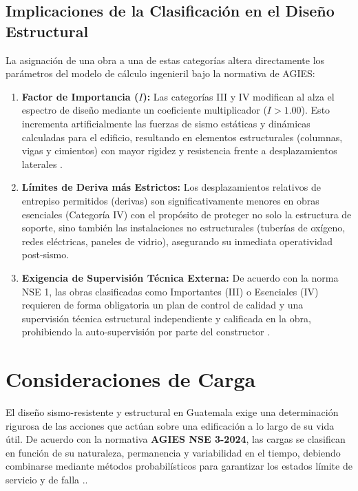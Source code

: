 \documentclass[14pt,letterpaper]{extarticle}
\begin{document}
	
	\subsection{Implicaciones de la Clasificación en el Diseño Estructural}
	La asignación de una obra a una de estas categorías altera directamente los parámetros del modelo de cálculo ingenieril bajo la normativa de AGIES:
	
	\begin{enumerate}
		\item \textbf{Factor de Importancia ($I$):} Las categorías III y IV modifican al alza el espectro de diseño mediante un coeficiente multiplicador ($I > 1.00$). Esto incrementa artificialmente las fuerzas de sismo estáticas y dinámicas calculadas para el edificio, resultando en elementos estructurales (columnas, vigas y cimientos) con mayor rigidez y resistencia frente a desplazamientos laterales .
		\item \textbf{Límites de Deriva más Estrictos:} Los desplazamientos relativos de entrepiso permitidos (derivas) son significativamente menores en obras esenciales (Categoría IV) con el propósito de proteger no solo la estructura de soporte, sino también las instalaciones no estructurales (tuberías de oxígeno, redes eléctricas, paneles de vidrio), asegurando su inmediata operatividad post-sismo.
		\item \textbf{Exigencia de Supervisión Técnica Externa:} De acuerdo con la norma NSE 1, las obras clasificadas como Importantes (III) o Esenciales (IV) requieren de forma obligatoria un plan de control de calidad y una supervisión técnica estructural independiente y calificada en la obra, prohibiendo la auto-supervisión por parte del constructor .
	\end{enumerate}
	
	
	

	\section{Consideraciones de Carga}
	
	El diseño sismo-resistente y estructural en Guatemala exige una determinación rigurosa de las acciones que actúan sobre una edificación a lo largo de su vida útil. De acuerdo con la normativa \textbf{AGIES NSE 3-2024}, las cargas se clasifican en función de su naturaleza, permanencia y variabilidad en el tiempo, debiendo combinarse mediante métodos probabilísticos para garantizar los estados límite de servicio y de falla ..
	
\end{document}
